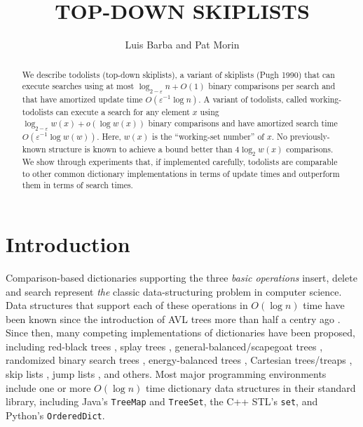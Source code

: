\documentclass[lotsofwhite]{patmorin}
\title{\MakeUppercase{Top-Down Skiplists}}
\author{Luis Barba and Pat Morin}
\newcommand{\eps}{\varepsilon}
\begin{document}
\begin{titlepage}
\maketitle

\begin{abstract}
  We describe todolists (top-down skiplists), a variant of skiplists
  (Pugh 1990) that can execute searches using at most $\log_{2-\eps} n +
  O(1)$ binary comparisons per search and that have amortized update time
  $O(\eps^{-1}\log n)$. A variant of todolists, called working-todolists
  can execute a search for any element $x$ using $\log_{2-\eps} w(x)
  + o(\log w(x))$ binary comparisons and have amortized search time
  $O(\eps^{-1}\log w(w))$. Here, $w(x)$ is the ``working-set number'' of
  $x$. No previously-known structure is known to achieve a bound better
  than $4\log_2 w(x)$ comparisons. We show through experiments that,
  if implemented carefully, todolists are comparable to other common
  dictionary implementations in terms of update times and outperform
  them in terms of search times.
\end{abstract}

\end{titlepage}

\section{Introduction}

Comparison-based dictionaries supporting the three \emph{basic
operations} insert, delete and search represent \emph{the} classic
data-structuring problem in computer science.  Data structures that
support each of these operations in $O(\log n)$ time have been known
since the introduction of AVL trees more than half a centry ago
\cite{adelson-velskii.landis:algorithm}.  Since then, many competing
implementations of dictionaries have been proposed, including
red-black trees \cite{guibas.sedgewick:dichromatic}, splay trees
\cite{sleator.tarjan:self-adjusting}, general-balanced/scapegoat
trees \cite{andersson:general,galperin.rivest:scapegoat},
randomized binary search trees \cite{martinez:randomized},
energy-balanced trees \cite{goodrich:competitive}, Cartesian trees/treaps
\cite{aragon.seidel:randomized,vuillemin:unifying}, skip lists
\cite{pugh:skip}, jump lists \cite{bronnimann.cazals.ea:randomized},
and others.  Most major programming environments include one or more
$O(\log n)$ time dictionary data structures in their standard library,
including Java's \texttt{TreeMap} and \texttt{TreeSet}, the C++ STL's
\texttt{set}, and Python's \texttt{OrderedDict}.
\end{document}

